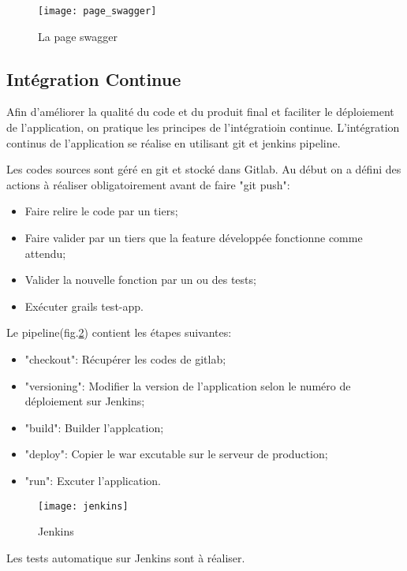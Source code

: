 \begin{figure}[ht]
 \centering
 \texttt{[image: page\_swagger]}
 \caption{La page swagger}
 \label{fig:page_swagger}
\end{figure}

\clearpage

\subsection{Intégration Continue}
Afin d'améliorer la qualité du code et du produit final et faciliter le déploiement de l'application, on pratique les principes de l'intégratioin continue.
L'intégration continus de l'application se réalise en utilisant git et jenkins pipeline.

Les codes sources sont géré en git et stocké dans Gitlab.
Au début on a défini des actions à réaliser obligatoirement avant de faire "git push":
\begin{itemize}
 \item Faire relire le code par un tiers;
 \item Faire valider par un tiers que la feature développée fonctionne comme attendu;
 \item Valider la nouvelle fonction par un ou des tests;
 \item Exécuter grails test-app.
\end{itemize}

Le pipeline(fig.\ref{fig:jenkins}) contient les étapes suivantes:
\begin{itemize}
 \item "checkout": Récupérer les codes de gitlab;
 \item "versioning": Modifier la version de l'application selon le numéro de déploiement sur Jenkins;
 \item "build": Builder l'applcation;
 \item "deploy": Copier le war excutable sur le serveur de production;
 \item "run": Excuter l'application.
\end{itemize}

\begin{figure}[ht]
 \centering
 \texttt{[image: jenkins]}
 \caption{Jenkins}
 \label{fig:jenkins}
\end{figure}

Les tests automatique sur Jenkins sont à réaliser.

\clearpage

\clearpage
